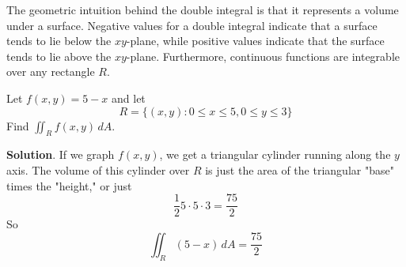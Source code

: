 \documentclass[10pt,]{book}
\theoremstyle{ptxplainnotitle}
\theoremstyle{ptxplaintitle}
\theoremstyle{ptxplainnotitle}
\theoremstyle{ptxplaintitle}
\theoremstyle{ptxplainnotitle}
\theoremstyle{ptxplaintitle}
\theoremstyle{ptxdefinitionnotitle}
\theoremstyle{ptxdefinitiontitle}
\theoremstyle{ptxdefinitionnotitle}
\theoremstyle{ptxdefinitiontitle}
\theoremstyle{ptxdefinitionnotitle}
\theoremstyle{ptxdefinitiontitle}
\theoremstyle{ptxdefinitionnotitle}
\theoremstyle{ptxdefinitiontitle}
\theoremstyle{ptxdefinitionnotitle}
\theoremstyle{ptxdefinitiontitle}
\numberwithin{equation}{section}
\begin{document}
\hypertarget{p-1117}{}%
The geometric intuition behind the double integral is that it represents a volume under a surface. Negative values for a double integral indicate that a surface tends to lie below the \(xy\)-plane, while positive values indicate that the surface tends to lie above the \(xy\)-plane. Furthermore, continuous functions are integrable over any rectangle \(R\).%
\begin{example}\label{example-double-integrals-by-volume}
\hypertarget{p-1118}{}%
Let \(f(x,y) = 5 - x\) and let%
\begin{equation*}
R = \{(x,y) : 0\leq x\leq 5, 0\leq y\leq 3\}
\end{equation*}
Find \(\iint_{R}f(x,y)\,dA\).%
\par\smallskip%
\noindent\textbf{Solution}.\hypertarget{solution-176}{}\quad%
\hypertarget{p-1119}{}%
If we graph \(f(x,y)\), we get a triangular cylinder running along the \(y\) axis. The volume of this cylinder over \(R\) is just the area of the triangular "base" times the "height," or just%
\begin{equation*}
\frac{1}{2}5\cdot5\cdot3 = \frac{75}{2}
\end{equation*}
So%
\begin{equation*}
\iint_{R}(5-x)\,dA = \frac{75}{2}
\end{equation*}
%
\end{example}
\typeout{************************************************}
\typeout{************************************************}
\end{document}
